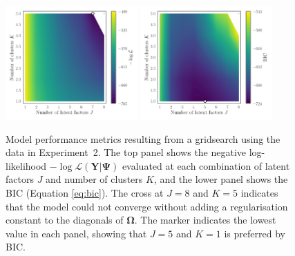 \documentclass[twocolumn]{aastex61}
\newcommand{\vect}[1]{\boldsymbol{\mathbf{#1}}}
\renewcommand{\vec}[1]{\vect{#1}}
\newcommand{\data}{\textbf{Y}}
\newcommand{\scorecovs}{\vec\Omega}
\begin{document}
\begin{figure}
	\includegraphics[width=0.45\textwidth]{experiments/exp2-gridsearch-ll.png}
	\includegraphics[width=0.45\textwidth]{experiments/exp2-gridsearch-bic.png}
    \caption{Model performance metrics resulting from a gridsearch using the
    		 \citet{Barklem:2003} data in Experiment~2.
    		 The top panel shows the negative log-likelihood 
			 $-\log{\mathcal{L}\left(\data|\vec\Psi\right)}$ 
			 evaluated at each combination of latent factors $J$ and number 
			 of clusters $K$, and the lower panel shows the BIC (Equation \ref{eq:bic}).
			 The cross at
			 $J=8$ and $K=5$ indicates that the model could not converge without
			 adding a regularisation constant to the diagonals of $\scorecovs$.
			 The marker indicates the lowest value in each panel, showing that
			 $J = 5$ and $K = 1$ is preferred by BIC.}
    \label{fig:exp2-gridsearch-contours}
\end{figure}
\end{document}
